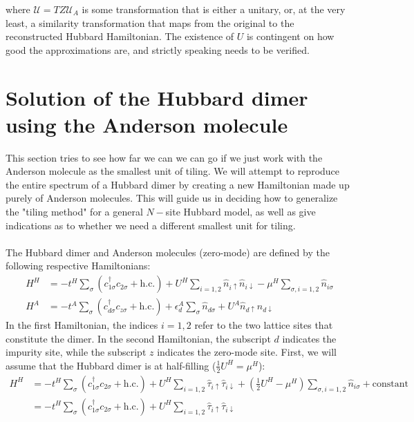 \documentclass[12pt]{article}
\numberwithin{equation}{section}
\begin{document}
where $\mathcal{U} = TZ\mathcal{U}_{A}$ is some transformation that is either a unitary, or, at the very least, a similarity transformation that maps from the original to the reconstructed Hubbard Hamiltonian. 
The existence of $U$ is contingent on how good the approximations are, and strictly speaking needs to be verified.

\section{Solution of the Hubbard dimer using the Anderson molecule}
This section tries to see how far we can we can go if we just work with the Anderson molecule as the smallest unit of tiling. We will attempt to reproduce the entire spectrum of a Hubbard dimer by creating a new Hamiltonian made up purely of Anderson molecules. This will guide us in deciding how to generalize the "tiling method" for a general $N-$site Hubbard model, as well as give indications as to whether we need a different smallest unit for tiling.
\\\\
The Hubbard dimer and Anderson molecules (zero-mode) are defined by the following respective Hamiltonians:
\begin{equation}\begin{aligned}
	H^H &= -t^H\sum_{\sigma}\left(c^\dagger_{1\sigma}c_{2\sigma} + \text{h.c.}\right) + U^H\sum_{i=1,2}\hat n_{i \uparrow}\hat n_{i \downarrow} - \mu^H \sum_{\sigma, i=1,2}\hat n_{i\sigma}\\
	H^A &= -t^A\sum_{\sigma}\left(c^\dagger_{d\sigma}c_{z\sigma} + \text{h.c.}\right) + \epsilon_d^A \sum_{\sigma}\hat n_{d\sigma} + U^A\hat n_{d \uparrow}\hat n_{d \downarrow}
\end{aligned}\end{equation}
In the first Hamiltonian, the indices \(i=1,2\) refer to the two lattice sites that constitute the dimer. In the second Hamiltonian, the subscript \(d\) indicates the impurity site, while the subscript \(z\) indicates the zero-mode site. First, we will assume that the Hubbard dimer is at half-filling (\(\frac{1}{2}U^H = \mu^H\)):
\begin{equation}\begin{aligned}
	\label{hubb_dimer}
	H^H &= -t^H\sum_{\sigma}\left(c^\dagger_{1\sigma}c_{2\sigma} + \text{h.c.}\right) + U^H\sum_{i=1,2}\hat \tau_{i \uparrow}\hat \tau_{i \downarrow} + \left(\frac{1}{2}U^H- \mu^H\right) \sum_{\sigma, i=1,2}\hat n_{i\sigma} + \text{constant}\\
	    &= -t^H\sum_{\sigma}\left(c^\dagger_{1\sigma}c_{2\sigma} + \text{h.c.}\right) + U^H\sum_{i=1,2}\hat \tau_{i \uparrow}\hat \tau_{i \downarrow}
\end{aligned}\end{equation}
\end{document}
